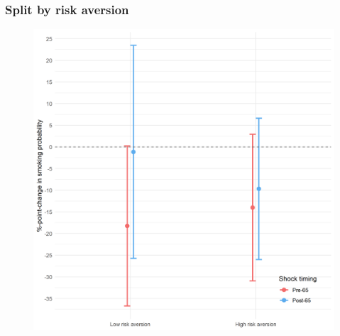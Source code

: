 \documentclass[10pt,compress,xcolor=dvipsnames,aspectratio=169]{beamer}    %
\newcounter{ex}
\newcommand{\1}[1]{\mathrm{1\hspace*{-2.5pt}l}[#1]}	%
\begin{document}
\begin{frame}
\frametitle{Split by risk aversion}

\begin{figure}[hbtp]
\centering
\includegraphics[height=0.8\textheight]{../../3_output/shock_effects/risk_6070_100_cv.png}
\label{fig:risk}
\end{figure}
\hyperlink{frame:otherX}{}
\end{frame}
\end{document}
